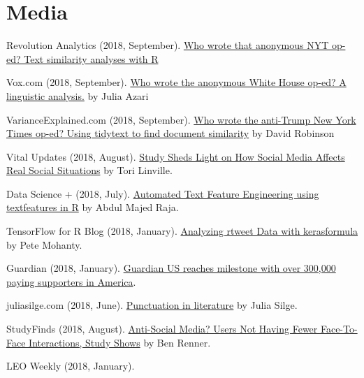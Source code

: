 \section{Media}
  \begin{bibenum}
    \item[] Revolution Analytics (2018, September).
      \href{http://blog.revolutionanalytics.com/2018/09/anonymous-nyt-op-ed.html}{Who wrote that anonymous NYT op-ed? Text similarity analyses with R}
    \item[] Vox.com (2018, September).
      \href{https://www.vox.com/mischiefs-of-faction/2018/9/7/17830304/who-wrote-anonymous-white-house-op-ed}{Who wrote the anonymous White House op-ed? A linguistic analysis.} by Julia Azari
    \item[] VarianceExplained.com (2018, September).
      \href{http://varianceexplained.org/r/op-ed-text-analysis/}{Who wrote the anti-Trump New York Times op-ed? Using tidytext to find document similarity} by David Robinson
    \item[] Vital Updates (2018, August).
      \href{https://vitalupdates.com/study-sheds-light-on-how-social-media-affects-real-social-situations/}{Study Sheds Light on How Social Media Affects Real Social Situations} by Tori Linville.
    \item[] Data Science {+} (2018, July).
      \href{https://datascienceplus.com/automated-text-feature-engineering-using-textfeatures-in-r/}{Automated Text Feature Engineering using textfeatures in R} by Abdul Majed Raja.
    \item[] TensorFlow for R Blog (2018, January).
      \href{https://blogs.rstudio.com/tensorflow/posts/2018-01-24-analyzing-rtweet-data-with-kerasformula/}{Analyzing rtweet Data with kerasformula} by Pete Mohanty.
    \item[] Guardian (2018, January).
      \href{https://www.theguardian.com/gnm-press-office/2018/jan/26/guardian-us-reaches-milestone-with-over-300000-paying-supporters-in-america}{Guardian US reaches milestone with over 300,000 paying supporters in America}.
    \item[] juliasilge.com (2018, June).
      \href{https://juliasilge.com/blog/punctution-literature/}{Punctuation in literature} by Julia Silge.
    \item[] StudyFinds (2018, August).
      \href{https://www.studyfinds.org/social-media-not-decrease-face-face-interaction-study-says/}{Anti-Social Media? Users Not Having Fewer Face-To-Face Interactions, Study Shows} by Ben Renner.
    \item[] LEO Weekly (2018, January).

\end{bibenum}
